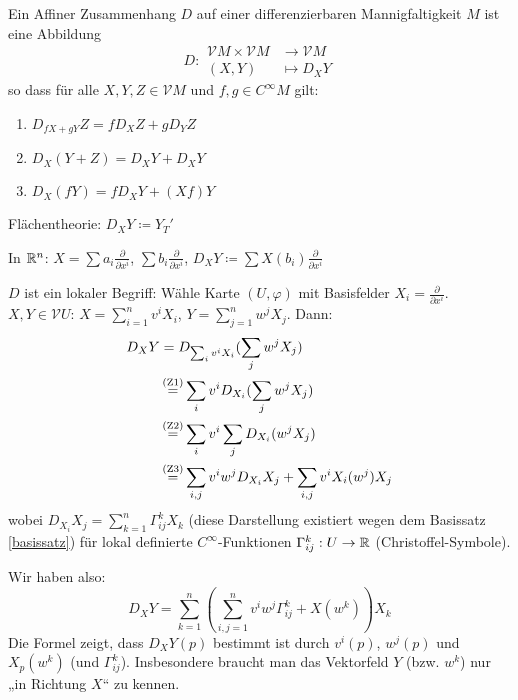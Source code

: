 \documentclass[a4paper,twoside,DIV15,BCOR12mm]{scrbook}
\renewcommand{\da}{\coloneqq}
\newcommand{\V}{\mathcal V}
\begin{document}
\begin{definition}
Ein Affiner Zusammenhang $D$ auf einer differenzierbaren Mannigfaltigkeit $M$ ist eine Abbildung
\[
D: 
\begin{aligned}
\V M \times \V M &\to \V M \\
(X,Y) &\mapsto D_XY
\end{aligned}
\]
so dass für alle $X,Y,Z \in \V M$ und $f,g \in C^\infty M$ gilt:
\begin{enumerate}[(Z1)]
\item $D_{fX + gY} Z = fD_XZ + gD_YZ$
\item $D_X(Y + Z) = D_X Y + D_X Y$
\item $D_X(fY) = fD_XY + (Xf)Y$
\end{enumerate}
\end{definition}

\begin{beispiele}
\item Flächentheorie: $D_X Y \da Y_T'$
\item In $\mathbb{R}^n$: $X= \sum a_i \frac\partial{\partial x^i}$, $\sum b_i \frac\partial{\partial x^i}$, $D_XY\da \sum X(b_i) \frac\partial{\partial x^i}$
\end{beispiele}

$D$ ist ein lokaler Begriff: Wähle Karte $(U,\varphi)$ mit Basisfelder $X_i=\frac\partial{\partial x^i}$. $X,Y\in \V U$: $X=\sum_{i=1}^n v^iX_i$, $Y=\sum_{j=1}^n w^j X_j$. Dann: 
\begin{align*}
D_XY &= D_{\sum_i v^iX_i}(\sum_jw^jX_j) \\
     &\gleichnach{\clap{(Z1)}} \sum_i v^i D_{X_i}(\sum_jw^jX_j) \\
     &\gleichnach{\clap{(Z2)}} \sum_i v^i \sum_j D_{X_i} (w^j X_j) \\
     &\gleichnach{\clap{(Z3)}} \sum_{i,j} v^iw^j D_{X_i}X_j + \sum_{i,j} v^i X_i(w^j)X_j
\end{align*}
wobei $D_{X_i}X_j = \sum_{k=1}^n \Gamma^k_{ij} X_k$ (diese Darstellung existiert wegen dem Basissatz \ref{basissatz}) für lokal definierte $C^\infty$-Funktionen $\Gamma_{ij}^k: U \to \mathbb{R}$ (Christoffel-Symbole)\label{Christoffel-Symbole}.

Wir haben also:
\[
D_XY = \sum_{k=1}^n (\sum_{i,j=1}^n v^i w^j \Gamma_{ij}^k + X(w^k))X_k
\]
Die Formel zeigt, dass $D_XY(p)$ bestimmt ist durch $v^i(p)$, $w^j(p)$ und $X_p(w^k)$ (und $\Gamma_{ij}^k$). Insbesondere braucht man das Vektorfeld $Y$ (bzw. $w^k$) nur „in Richtung $X$“ zu kennen.
\end{document}

